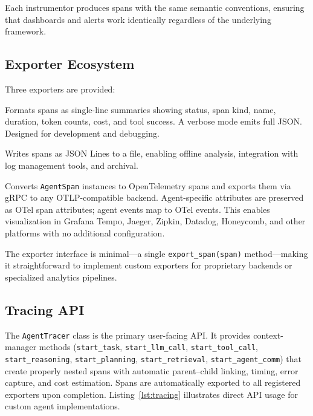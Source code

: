 \documentclass[sigconf,nonacm]{acmart}
\begin{document}
Each instrumentor produces spans with the same semantic conventions,
ensuring that dashboards and alerts work identically regardless of the
underlying framework.

\subsection{Exporter Ecosystem}
\label{sec:exporters}

Three exporters are provided:

\begin{description}[leftmargin=*,nosep,style=unboxed]
    \item[ConsoleExporter.]  Formats spans as single-line summaries
        showing status, span kind, name, duration, token counts, cost,
        and tool success.  A verbose mode emits full JSON.  Designed
        for development and debugging.
    \item[JSONFileExporter.]  Writes spans as JSON Lines to a file,
        enabling offline analysis, integration with log management
        tools, and archival.
    \item[OTLPExporter.]  Converts \texttt{AgentSpan} instances to
        OpenTelemetry spans and exports them via gRPC to any
        OTLP-compatible backend.  Agent-specific attributes are
        preserved as OTel span attributes; agent events map to OTel
        events.  This enables visualization in Grafana Tempo, Jaeger,
        Zipkin, Datadog, Honeycomb, and other platforms with no
        additional configuration.
\end{description}

The exporter interface is minimal---a single \texttt{export\_span(span)}
method---making it straightforward to implement custom exporters for
proprietary backends or specialized analytics pipelines.

\subsection{Tracing API}
\label{sec:tracing_api}

The \texttt{AgentTracer} class is the primary user-facing API.  It
provides context-manager methods (\texttt{start\_task},
\texttt{start\_llm\_call}, \texttt{start\_tool\_call},
\texttt{start\_reasoning}, \texttt{start\_planning},
\texttt{start\_retrieval}, \texttt{start\_agent\_comm}) that create
properly nested spans with automatic parent--child linking, timing,
error capture, and cost estimation.  Spans are automatically exported
to all registered exporters upon completion.  Listing~\ref{lst:tracing}
illustrates direct API usage for custom agent implementations.
\end{document}
